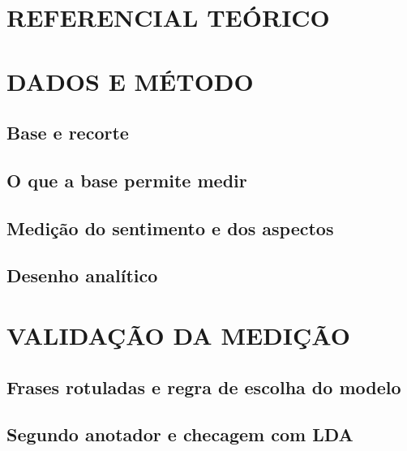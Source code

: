\documentclass[oneside,a4paper,portuguese,links]{EngUCP}
\begin{document}
\section{REFERENCIAL TEÓRICO}

\section{DADOS E MÉTODO}
\subsection{Base e recorte}            %
\subsection{O que a base permite medir} %
\subsection{Medição do sentimento e dos aspectos} %
\subsection{Desenho analítico}          %

\section{VALIDAÇÃO DA MEDIÇÃO}
\subsection{Frases rotuladas e regra de escolha do modelo} %
\subsection{Segundo anotador e checagem com LDA}           %
\end{document}
